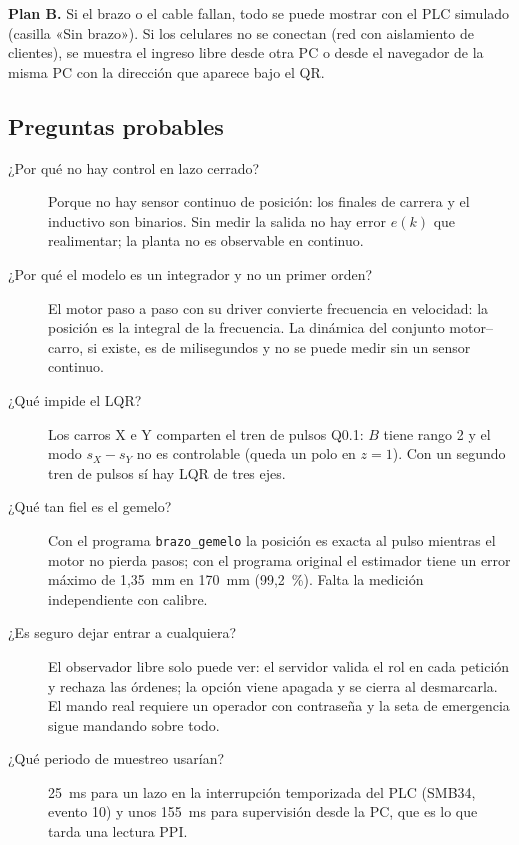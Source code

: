 \documentclass[11pt,a4paper]{article}
\newcommand{\codigo}[1]{\texttt{#1}}
\begin{document}
\begin{nota}
\textbf{Plan B.} Si el brazo o el cable fallan, todo se puede mostrar con el PLC simulado (casilla «Sin brazo»).
Si los celulares no se conectan (red con aislamiento de clientes), se muestra el ingreso libre desde otra PC o
desde el navegador de la misma PC con la dirección que aparece bajo el QR.
\end{nota}

\subsection{Preguntas probables}
\begin{description}
\item[¿Por qué no hay control en lazo cerrado?] Porque no hay sensor continuo de posición: los finales de carrera y el inductivo son binarios. Sin medir la salida no hay error $e(k)$ que realimentar; la planta no es observable en continuo.
\item[¿Por qué el modelo es un integrador y no un primer orden?] El motor paso a paso con su driver convierte frecuencia en velocidad: la posición es la integral de la frecuencia. La dinámica del conjunto motor--carro, si existe, es de milisegundos y no se puede medir sin un sensor continuo.
\item[¿Qué impide el LQR?] Los carros X e Y comparten el tren de pulsos Q0.1: $B$ tiene rango 2 y el modo $s_X - s_Y$ no es controlable (queda un polo en $z=1$). Con un segundo tren de pulsos sí hay LQR de tres ejes.
\item[¿Qué tan fiel es el gemelo?] Con el programa \codigo{brazo\_gemelo} la posición es exacta al pulso mientras el motor no pierda pasos; con el programa original el estimador tiene un error máximo de 1,35~mm en 170~mm (99,2~\%). Falta la medición independiente con calibre.
\item[¿Es seguro dejar entrar a cualquiera?] El observador libre solo puede ver: el servidor valida el rol en cada petición y rechaza las órdenes; la opción viene apagada y se cierra al desmarcarla. El mando real requiere un operador con contraseña y la seta de emergencia sigue mandando sobre todo.
\item[¿Qué periodo de muestreo usarían?] 25~ms para un lazo en la interrupción temporizada del PLC (SMB34, evento 10) y unos 155~ms para supervisión desde la PC, que es lo que tarda una lectura PPI.
\end{description}
\end{document}
